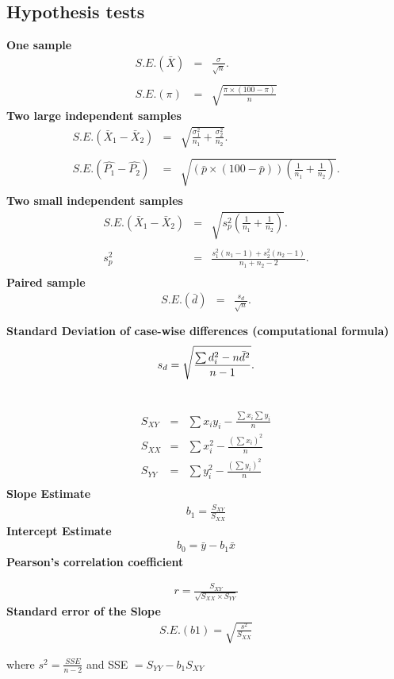 \documentclass[a4paper,12pt]{article}
\begin{document}
\subsection*{Hypothesis tests}
{\bf One sample}
\begin{eqnarray*}
S.E.(\bar{X})&=&\frac{\sigma}{\sqrt{n}}.\\\\
S.E.(\pi)&=&\sqrt{\frac{\pi\times(100-\pi)}{n}}
\end{eqnarray*}
{\bf Two large independent samples}
\begin{eqnarray*}
S.E.(\bar{X}_1-\bar{X}_2)&=&\sqrt{\frac{\sigma^2_1}{n_1}+\frac{\sigma_2^2}{n_2}}.\\\\
S.E.(\hat{P_1}-\hat{P_2})&=&\sqrt{\left(\bar{p}\times(100-\bar{p})\right)\left(\frac{1}{n_1}+\frac{1}{n_2}\right)}.\\
\end{eqnarray*}
{\bf Two small independent samples}
\begin{eqnarray*}
S.E.(\bar{X}_1-\bar{X}_2)&=&\sqrt{s_p^2\left(\frac{1}{n_1}+\frac{1}{n_2}\right)}.\\\\
s_p^2&=&\frac{s_1^2(n_1-1)+s_2^2(n_2-1)}{n_1+n_2-2}.\\
\end{eqnarray*}
{\bf Paired sample}
\begin{eqnarray*}
S.E.(\bar{d})&=&\frac{s_d}{\sqrt{n}}.\\\\
\end{eqnarray*}
{\bf Standard Deviation of case-wise differences (computational formula)}
\begin{eqnarray*}
s_d = \sqrt{ {\sum d_i^2 - n\bar{d}^2 \over n-1}}.\\\\
\end{eqnarray*}



\begin{eqnarray*}
S_{XY} &=&
\sum x_iy_i - \frac{\sum x_i\sum y_i}{n}\\
S_{XX} &=&
\sum x_i^2 - \frac{(\sum x_i)^2}{n}\\
S_{YY} &=&
\sum y_i^2 - \frac{(\sum y_i)^2}{n}\\
\end{eqnarray*}
{\bf Slope Estimate}
\begin{eqnarray*}
b_1 = \frac{S_{XY}}{S_{XX}}
\end{eqnarray*}
{\bf Intercept Estimate}
\begin{eqnarray*}
 b_0 = \bar{y} -b_1\bar{x}
\end{eqnarray*}
{\bf Pearson's correlation coefficient}

\begin{eqnarray*}
r = \frac{S_{XY}}{\sqrt{S_{XX} \times S_{YY}}}
\end{eqnarray*}
{\bf Standard error of the Slope}
\begin{eqnarray*}
S.E.(b1) = \sqrt{\frac{s^2}{S_{XX}}}
\end{eqnarray*}

where $s^2 = \frac{SSE}{n-2}$
and SSE $= S_{YY} - b_1S_{XY}$
\end{document}
